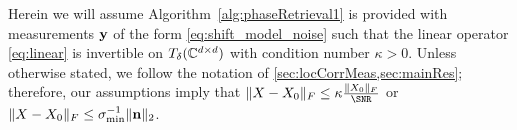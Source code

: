 
Herein we will assume Algorithm~\ref{alg:phaseRetrieval1} is provided with measurements $\mathbf y$ of the form \eqref{eq:shift_model_noise} such that the linear operator \eqref{eq:linear} is invertible on $T_{\delta}(\mathbb{C}^{d \times d})$ with condition number $\kappa > 0$.  Unless otherwise stated, we follow the notation of \cref{sec:locCorrMeas,sec:mainRes}; therefore, our assumptions imply that $\norm{X - X_0}_F \le \kappa \frac{\norm{X_0}_F}{\SNR}$ or $\lVert X - X_0\rVert_F \le \sigma_{\min}^{-1} \lVert\mathbf n\rVert_2$.

